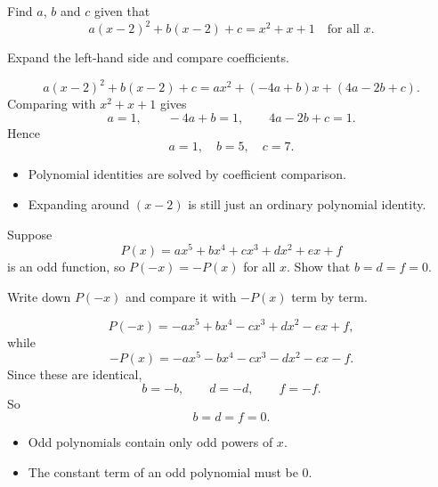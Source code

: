 
\begin{problem}
Find $a$, $b$ and $c$ given that
\[
a(x-2)^2+b(x-2)+c=x^2+x+1
\quad\text{for all }x.
\]
\end{problem}

\begin{hintbox}
Expand the left-hand side and compare coefficients.
\end{hintbox}

\begin{solution}
\[
a(x-2)^2+b(x-2)+c=ax^2+(-4a+b)x+(4a-2b+c).
\]
Comparing with $x^2+x+1$ gives
\[
a=1,\qquad -4a+b=1,\qquad 4a-2b+c=1.
\]
Hence
\[
\boxed{a=1,\quad b=5,\quad c=7.}
\]
\end{solution}

\begin{takeaways}
\begin{itemize}[leftmargin=*]
\item Polynomial identities are solved by coefficient comparison.
\item Expanding around $(x-2)$ is still just an ordinary polynomial identity.
\end{itemize}
\end{takeaways}

\begin{problem}
Suppose
\[
P(x)=ax^5+bx^4+cx^3+dx^2+ex+f
\]
is an odd function, so $P(-x)=-P(x)$ for all $x$. Show that $b=d=f=0$.
\end{problem}

\begin{hintbox}
Write down $P(-x)$ and compare it with $-P(x)$ term by term.
\end{hintbox}

\begin{solution}
\[
P(-x)=-ax^5+bx^4-cx^3+dx^2-ex+f,
\]
while
\[
-P(x)=-ax^5-bx^4-cx^3-dx^2-ex-f.
\]
Since these are identical,
\[
b=-b,\qquad d=-d,\qquad f=-f.
\]
So
\[
\boxed{b=d=f=0.}
\]
\end{solution}

\begin{takeaways}
\begin{itemize}[leftmargin=*]
\item Odd polynomials contain only odd powers of $x$.
\item The constant term of an odd polynomial must be $0$.
\end{itemize}
\end{takeaways}

